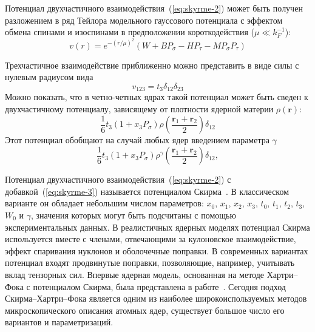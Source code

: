 Потенциал двухчастичного взаимодействия~(\ref{eq:skyrme-2}) может быть получен разложением в ряд Тейлора модельного гауссового потенциала с эффектом обмена спинами и изоспинами в предположении короткодействия ($\mu \ll k_F^{-1}$):
\begin{equation}
v(r) = e^{-(r/\mu)^2} (W + B P_\sigma - H P_\tau - M P_\sigma P_\tau)
\end{equation}

Трехчастичное взаимодействие приближенно можно представить в виде силы с нулевым радиусом вида
\begin{equation}
v_{123} = t_3 \delta_{12} \delta_{23}
\end{equation}
Можно показать, что в четно-четных ядрах такой потенциал может быть сведен к двухчастичному потенциалу, зависящему от плотности ядерной материи $\rho(\bm{r})$:
\begin{equation}
\displaystyle
\frac{1}{6} t_3 (1 + x_3 P_\sigma) 
\rho(\frac{\bm{r}_1 + \bm{r}_2}{2}) \delta_{12}
\end{equation}
Этот потенциал обобщают на случай любых ядер введением параметра $\gamma$
\begin{equation}
\displaystyle
\frac{1}{6} t_3 (1 + x_3 P_\sigma) 
\rho^\gamma(\frac{\bm{r}_1 + \bm{r}_2}{2}) \delta_{12},
\label{eq:skyrme-3}
\end{equation}

Потенциал двухчастичного взаимодействия~(\ref{eq:skyrme-2}) с добавкой~(\ref{eq:skyrme-3}) называется потенциалом Скирма~\cite{skyrme1958}. В классическом варианте он обладает небольшим числом параметров: $x_0$, $x_1$, $x_2$, $x_3$, $t_0$, $t_1$, $t_2$, $t_3$, $W_0$ и $\gamma$, значения которых могут быть подсчитаны с помощью экспериментальных данных. В реалистичных ядерных моделях потенциал Скирма используется вместе с членами, отвечающими за кулоновское взаимодействие, эффект спаривания нуклонов и оболочечные поправки. В современных вариантах потенциал входят продвинутые поправки, позволяющие, например, учитывать вклад тензорных сил. Впервые ядерная модель, основанная на методе Хартри--Фока с потенциалом Скирма, была представлена в работе~\cite{vautherin1972}. Сегодня подход Скирма--Хартри--Фока является одним из наиболее широкоиспользуемых методов микроскопического описания атомных ядер, существует большое число его вариантов и параметризаций.
